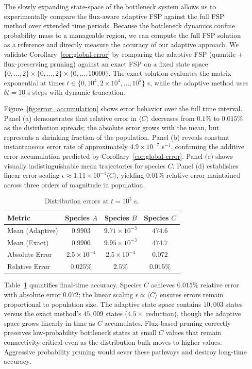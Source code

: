 \documentclass[onefignum,onetabnum]{siamart171218}
\begin{document}
The slowly expanding state-space of the bottleneck system allows us to experimentally compare the flux-aware adaptive FSP against the full FSP method over extended time periods. Because the bottleneck dynamics confine probability mass to a manageable region, we can compute the full FSP solution as a reference and directly measure the accuracy of our adaptive approach. We validate Corollary~\ref{cor:global-error} by comparing the adaptive FSP (quantile + flux-preserving pruning) against an exact FSP on a fixed state space $\{0,\ldots,2\} \times \{0,\ldots,2\} \times \{0,\ldots,10000\}$. The exact solution evaluates the matrix exponential at times $t \in \{0, 10^4, 2\times10^4, \ldots, 10^5\}$ s, while the adaptive method uses $\delta t = 10$ s steps with dynamic truncation.

Figure~\ref{fig:error_accumulation} shows error behavior over the full time interval. Panel (a) demonstrates that relative error in $\langle C \rangle$ decreases from $0.1\%$ to $0.015\%$ as the distribution spreads; the absolute error grows with the mean, but represents a shrinking fraction of the population. Panel (b) reveals constant instantaneous error rate of approximately $4.9 \times 10^{-7}$ s$^{-1}$, confirming the additive error accumulation predicted by Corollary~\ref{cor:global-error}. Panel (c) shows visually indistinguishable mean trajectories for species $C$. Panel (d) establishes linear error scaling $\epsilon \approx 1.11 \times 10^{-4} \langle C \rangle$, yielding $0.01\%$ relative error maintained across three orders of magnitude in population.

\begin{table}[htbp]
\centering
\caption{Distribution errors at $t = 10^5$ s.}
\label{tab:distribution_errors}
\begin{tabular}{lccc}
\hline
\textbf{Metric} & \textbf{Species $A$} & \textbf{Species $B$} & \textbf{Species $C$} \\
\hline
Mean (Adaptive) & $0.9903$ & $9.71 \times 10^{-3}$ & $474.6$ \\
Mean (Exact) & $0.9900$ & $9.95 \times 10^{-3}$ & $474.7$ \\
Absolute Error & $2.5 \times 10^{-4}$ & $2.5 \times 10^{-4}$ & $0.072$ \\
Relative Error & $0.025\%$ & $2.5\%$ & $0.015\%$ \\
\hline
\end{tabular}
\end{table}

Table~\ref{tab:distribution_errors} quantifies final-time accuracy. Species $C$ achieves $0.015\%$ relative error with absolute error $0.072$; the linear scaling $\epsilon \propto \langle C \rangle$ ensures errors remain proportional to population size. The adaptive state space contains $10{,}003$ states versus the exact method's $45{,}009$ states ($4.5\times$ reduction), though the adaptive space grows linearly in time as $C$ accumulates. Flux-based pruning correctly preserves low-probability bottleneck states at small $C$ values that remain connectivity-critical even as the distribution bulk moves to higher values. Aggressive probability pruning would sever these pathways and destroy long-time accuracy.
\end{document}
